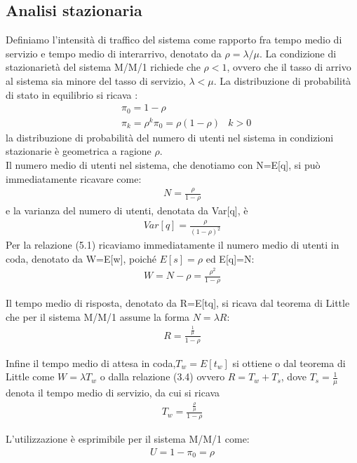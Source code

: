 \subsection{Analisi stazionaria}
Definiamo l’intensità di traffico del sistema come rapporto fra tempo medio di servizio e tempo medio di interarrivo, denotato da $\rho = \lambda / \mu$. La condizione di
stazionarietà del sistema M/M/1 richiede che $\rho <1$, ovvero che il tasso di arrivo al
sistema sia minore del tasso di servizio, $\lambda < \mu$. La distribuzione di probabilità di stato in
equilibrio  si ricava :
\begin{align}
    & \pi_0 = 1- \rho \\
    &\pi_k = \rho^k \pi_0 = \rho (1-\rho) & k>0
\end{align}
la distribuzione di probabilità del numero di utenti nel sistema in condizioni stazionarie è geometrica a ragione $\rho$. \\
Il numero medio di utenti nel sistema, che denotiamo con N=E[q], si può immediatamente ricavare come:
\begin{align}
    N = \frac{\rho }{1-\rho} 
\end{align}
e la varianza del numero di utenti, denotata da Var[q], è
\begin{align}
    Var[q] = \frac{\rho}{(1-\rho)^2}
\end{align}
Per la relazione (5.1) ricaviamo immediatamente il numero medio di utenti in coda,
denotato da W=E[w], poiché $E[s] =\rho$ ed E[q]=N:
\begin{align}
    W = N-\rho = \frac{\rho^2 }{1-\rho}
\end{align}

Il tempo medio di risposta, denotato da R=E[tq], si ricava dal teorema di Little  che per il sistema M/M/1 assume la forma $N= \lambda R$:
\begin{align}
    R = \frac{\frac{1}{\mu}}{1-\rho}
\end{align}

Infine il tempo medio di attesa in coda,$T_w=E[t_w]$ si ottiene o dal teorema di Little come $W = \lambda T_w$ o dalla relazione (3.4) ovvero $R = T_w +T_s$, dove $T_s = \frac{1}{\mu}$ denota il tempo medio di servizio, da cui si ricava
\begin{align}
    T_w = \frac{\frac{\rho}{\mu}}{1-\rho}
\end{align}

L’utilizzazione è esprimibile per il sistema M/M/1 come:
\begin{align}
    U = 1 -\pi_0 = \rho
\end{align}


